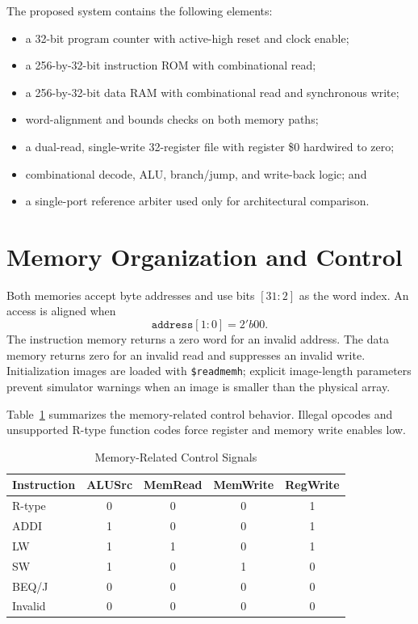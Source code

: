 \documentclass[conference]{IEEEtran}
\begin{document}
The proposed system contains the following elements:
\begin{itemize}
  \item a 32-bit program counter with active-high reset and clock enable;
  \item a 256-by-32-bit instruction ROM with combinational read;
  \item a 256-by-32-bit data RAM with combinational read and synchronous write;
  \item word-alignment and bounds checks on both memory paths;
  \item a dual-read, single-write 32-register file with register \$0 hardwired to zero;
  \item combinational decode, ALU, branch/jump, and write-back logic; and
  \item a single-port reference arbiter used only for architectural comparison.
\end{itemize}

\section{Memory Organization and Control}
Both memories accept byte addresses and use bits $[31:2]$ as the word index. An access is aligned when
\begin{equation}
  \texttt{address}[1:0] = 2'b00.
\end{equation}
The instruction memory returns a zero word for an invalid address. The data memory returns zero for an invalid read and suppresses an invalid write. Initialization images are loaded with \texttt{\$readmemh}; explicit image-length parameters prevent simulator warnings when an image is smaller than the physical array.

Table~\ref{tab:control} summarizes the memory-related control behavior. Illegal opcodes and unsupported R-type function codes force register and memory write enables low.

\begin{table}[t]
\centering
\caption{Memory-Related Control Signals}
\label{tab:control}
\begin{tabular}{@{}lcccc@{}}
\toprule
Instruction & ALUSrc & MemRead & MemWrite & RegWrite \\
\midrule
R-type & 0 & 0 & 0 & 1 \\
ADDI   & 1 & 0 & 0 & 1 \\
LW     & 1 & 1 & 0 & 1 \\
SW     & 1 & 0 & 1 & 0 \\
BEQ/J  & 0 & 0 & 0 & 0 \\
Invalid& 0 & 0 & 0 & 0 \\
\bottomrule
\end{tabular}
\end{table}
\end{document}

